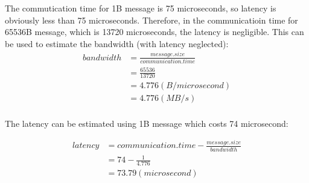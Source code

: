 \documentclass[12pt]{article}
\begin{document}
The commutication time for 1B message is 75 microseconds, so latency is obviously less than 75 microseconds. Therefore, in the communicatioin time for 65536B message, which is 13720 microseconds, the latency is negligible. This can be used to estimate the bandwidth (with latency neglected):
\begin{align*}
  bandwidth &= \frac{message.size}{communication.time}\\
  &= \frac{65536}{13720}\\
  &= 4.776 (B/microsecond)\\
  &= 4.776 (MB/s)\\
\end{align*}

The latency can be estimated using 1B message which costs 74 microsecond:

\begin{align*}
  latency &= communication.time - \frac{message.size}{bandwidth}\\
  &= 74 - \frac{1}{4.776}\\
  &= 73.79 (microsecond)\\
\end{align*}
\end{document}
